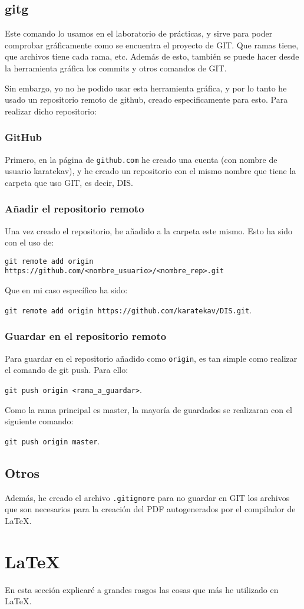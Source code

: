 \documentclass[a4,12pt]{article}
\begin{document}
\subsection{gitg}
Este comando lo usamos en el laboratorio de prácticas, y sirve para poder comprobar gráficamente como se encuentra el proyecto de GIT. Que ramas tiene, que archivos tiene cada rama, etc. Además de esto, también se puede hacer desde la herramienta gráfica los commits y otros comandos de GIT.

\bigskip
Sin embargo, yo no he podido usar esta herramienta gráfica, y por lo tanto he usado un repositorio remoto de github, creado especificamente para esto. Para realizar dicho repositorio:

\subsubsection{GitHub}
Primero, en la página de \texttt{github.com} he creado una cuenta (con nombre de usuario karatekav), y he creado un repositorio con el mismo nombre que tiene la carpeta que uso GIT, es decir, DIS.

\subsubsection{Añadir el repositorio remoto}
Una vez creado el repositorio, he añadido a la carpeta este mismo. Esto ha sido con el uso de: 

\noindent\texttt{git remote add origin https://github.com/<nombre\_usuario>/<nombre\_rep>.git} 

Que en mi caso específico ha sido: 

\noindent\texttt{git remote add origin https://github.com/karatekav/DIS.git}.

\subsubsection{Guardar en el repositorio remoto}
Para guardar en el repositorio añadido como \texttt{origin}, es tan simple como realizar el comando de git push. Para ello:

\noindent\texttt{git push origin <rama\_a\_guardar>}.

Como la rama principal es master, la mayoría de guardados se realizaran con el siguiente comando:

\noindent\texttt{git push origin master}.

\subsection{Otros}
Además, he creado el archivo \texttt{.gitignore} para no guardar en GIT los archivos que son necesarios para la creación del PDF autogenerados por el compilador de \LaTeX .

\newpage

\section{\LaTeX}

En esta sección explicaré a grandes rasgos las cosas que más he utilizado en \LaTeX.
\end{document}
